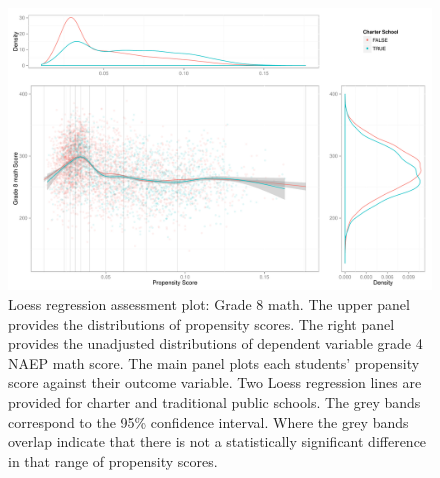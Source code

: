 \begin{figure}[h!]
\begin{center}
\includegraphics{../Figures2009/g8math-loess.pdf}
\caption[Loess regression assessment plot: Grade 8 math]{Loess regression assessment plot: Grade 8 math. The upper panel provides the distributions of propensity scores. The right panel provides the unadjusted distributions of dependent variable grade 4 NAEP math score. The main panel plots each students' propensity score against their outcome variable. Two Loess regression lines are provided for charter and traditional public schools. The grey bands correspond to the 95\% confidence interval. Where the grey bands overlap indicate that there is not a statistically significant difference in that range of propensity scores.}
\label{fig:g8math:loess}
\end{center}
\end{figure}

